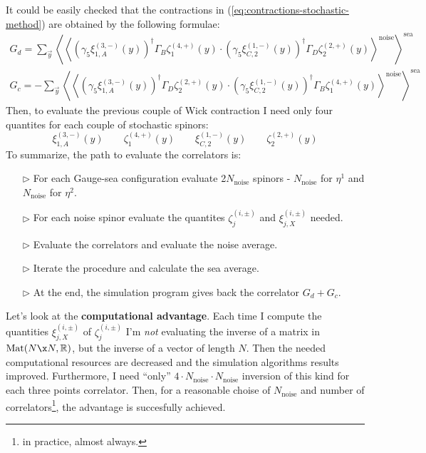 \documentclass[english, LaM, oneside, noexaminfo]{sapthesis}
\begin{document}
It could be easily checked that the contractions in (\ref{eq:contractions-stochastic-method}) are obtained by the following formulae:
\begin{equation*}
    \begin{gathered}
        G_d =   \sum_{\vec y} \left\langle \left\langle \left(\gamma_5\xi^{(3,-)}_{1,A} (y) \right)^\dag \Gamma_B \zeta^{(4,+)}_1 (y) \cdot \left(\gamma_5\xi^{(1,-)}_{C,2} (y) \right)^\dag \Gamma_D \zeta^{(2,+)}_2 (y) \right\rangle^\text{noise} \right\rangle^{\text{sea}} \\
        G_c = - \sum_{\vec y} \left\langle \left\langle \left(\gamma_5\xi^{(3,-)}_{1,A} (y) \right)^\dag \Gamma_D \zeta^{(2,+)}_2 (y) \cdot \left(\gamma_5\xi^{(1,-)}_{C,2} (y) \right)^\dag \Gamma_B \zeta^{(4,+)}_1 (y) \right\rangle^\text{noise} \right\rangle^{\text{sea}}
    \end{gathered}
\end{equation*}
Then, to evaluate the previous couple of Wick contraction I need only four quantites for each couple of stochastic spinors:
\begin{equation*}
    \xi^{(3,-)}_{1,A} (y) \qquad  \zeta^{(4,+)}_1 (y) \qquad \xi^{(1,-)}_{C,2} (y) \qquad  \zeta^{(2,+)}_2 (y)
\end{equation*}
To summarize, the path to evaluate the correlators is:
\begin{itemize}
    \item [$\triangleright$] For each Gauge-sea configuration evaluate 2$N_{\text{noise}}$ spinors - $N_{\text{noise}}$ for $\eta^1$ and $N_{\text{noise}}$ for $\eta^2$. 
    \item [$\triangleright$] For each noise spinor evaluate the quantites $\zeta^{(i,\pm)}_j$ and $\xi^{(i,\pm)}_{j,X}$ needed.
    \item [$\triangleright$] Evaluate the correlators and evaluate the noise average.
    \item [$\triangleright$] Iterate the procedure and calculate the sea average.
    \item [$\triangleright$] At the end, the simulation program gives back the correlator $G_d+G_c$.
\end{itemize}
Let's look at the {\bf computational advantage}.
Each time I compute the quantities $\xi^{(i,\pm)}_{j,X}$ of $\zeta^{(i,\pm)}_j$ I'm {\it not} evaluating the inverse of a matrix in $\text{Mat}(N\x N, \mathbb{R})$, but the inverse of a vector of length $N$.
Then the needed computational resources are decreased and the simulation algorithms results improved.
Furthermore, I need ``only'' $4\cdot N_\text{noise} \cdot N_\text{noise}$ inversion of this kind for each three points correlator.
Then, for a reasonable choise of $N_\text{noise}$ and number of correlators\footnote{in practice, almost always.}, the advantage is succesfully achieved.
\end{document}
